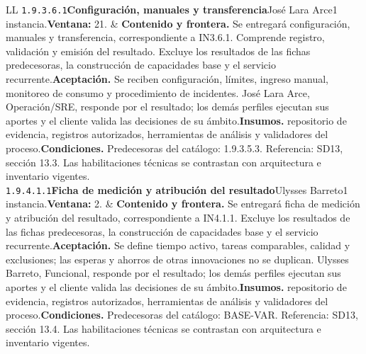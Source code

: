 \begin{longtable}{L{\tabcolsep\relax}L{\tabcolsep\relax}}
\texttt{1.\allowbreak{}9.\allowbreak{}3.\allowbreak{}6.\allowbreak{}1}\newline{}\textbf{Configuración, manuales y transferencia}\newline{}José Lara Arce\newline{}1 instancia.\newline{}\textbf{Ventana:} 21. & \textbf{Contenido y frontera.} Se entregará configuración, manuales y transferencia, correspondiente a IN3.6.1. Comprende registro, validación y emisión del resultado. Excluye los resultados de las fichas predecesoras, la construcción de capacidades base y el servicio recurrente.\newline{}\textbf{Aceptación.} Se reciben configuración, límites, ingreso manual, monitoreo de consumo y procedimiento de incidentes. José Lara Arce, Operación/SRE, responde por el resultado; los demás perfiles ejecutan sus aportes y el cliente valida las decisiones de su ámbito.\newline{}\textbf{Insumos.} repositorio de evidencia, registros autorizados, herramientas de análisis y validadores del proceso.\newline{}\textbf{Condiciones.} Predecesoras del catálogo: 1.9.3.5.3. Referencia: SD13, sección 13.3. Las habilitaciones técnicas se contrastan con arquitectura e inventario vigentes.\\\hline
\texttt{1.\allowbreak{}9.\allowbreak{}4.\allowbreak{}1.\allowbreak{}1}\newline{}\textbf{Ficha de medición y atribución del resultado}\newline{}Ulysses Barreto\newline{}1 instancia.\newline{}\textbf{Ventana:} 2. & \textbf{Contenido y frontera.} Se entregará ficha de medición y atribución del resultado, correspondiente a IN4.1.1. Excluye los resultados de las fichas predecesoras, la construcción de capacidades base y el servicio recurrente.\newline{}\textbf{Aceptación.} Se define tiempo activo, tareas comparables, calidad y exclusiones; las esperas y ahorros de otras innovaciones no se duplican. Ulysses Barreto, Funcional, responde por el resultado; los demás perfiles ejecutan sus aportes y el cliente valida las decisiones de su ámbito.\newline{}\textbf{Insumos.} repositorio de evidencia, registros autorizados, herramientas de análisis y validadores del proceso.\newline{}\textbf{Condiciones.} Predecesoras del catálogo: BASE-VAR. Referencia: SD13, sección 13.4. Las habilitaciones técnicas se contrastan con arquitectura e inventario vigentes.\\\hline

\end{longtable}
